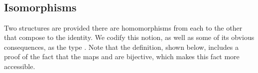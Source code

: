 \begin{code}
\AgdaSpace{}%
%
\>[97]\<%
\\
%
\>[14]\AgdaSymbol{(}\AgdaSpace{}%
\AgdaSpace{}%
\AgdaSymbol{)}%
\>[23]\AgdaSymbol{(}\AgdaSpace{}%
\AgdaSpace{}%
\AgdaSymbol{(}%
\>[31]%
\>[36]%
\>[39]%
\>[42]\AgdaSymbol{))}%
\>[48]\AgdaSpace{}%
\AgdaSpace{}%
\AgdaSpace{}%
\AgdaSpace{}%
\AgdaOperator{\AgdaFunction{𝔻[}}\AgdaSpace{}%
\AgdaSpace{}%
\AgdaOperator{\AgdaFunction{]}}\<%
\\
%
\\[\AgdaEmptyExtraSkip]%
%
\>[2]\AgdaSpace{}%
\AgdaSymbol{:}\AgdaSpace{}%
\AgdaSpace{}%
\AgdaSpace{}%
\AgdaSpace{}%
\<%
\\
%
\>[2]\AgdaSpace{}%
\AgdaSpace{}%
\AgdaSymbol{=}\AgdaSpace{}%
\<%
\end{code}

\subsection{Isomorphisms}
\label{isomorphisms}
\fi      %

Two structures are  provided there are homomorphisms from each to the
other that compose to the identity. We codify this notion, as
well as some of its obvious consequences, as the type .
\ifshort
\else
Note that the definition, shown below, includes a proof of the fact that the maps  and
 are bijective, which makes this fact more accessible.

